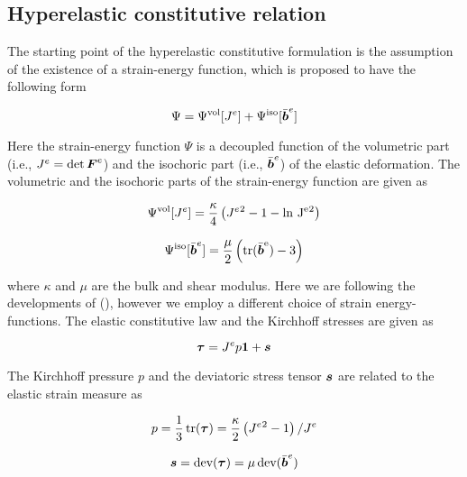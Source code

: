 \documentclass[11pt]{article}
\theoremstyle{remark}
\begin{document}
\subsection{Hyperelastic constitutive relation}
The starting point of the hyperelastic constitutive formulation is 
the assumption of the existence of a strain-energy function, which is
proposed to have the following form

\begin{equation}
\Psi=\Psi^{\rm vol}[J^e] + \Psi^{\rm iso}[\bar{{\boldsymbol{b}}}^e]
\end{equation}

Here the strain-energy function $\Psi$ is a decoupled function of the
volumetric part (i.e., $J^e=\det{\boldsymbol{F}}^e$) and the isochoric part (i.e.,
$\bar{{\boldsymbol{b}}}^e$) of the elastic deformation. The volumetric and the
isochoric parts of the strain-energy function are given as

\begin{equation}
  \Psi^{\rm vol}[J^e] =\frac{\kappa}{4}\left(J^e{^2} - 1 - \rm ln~J^e{^2}\right)
\end{equation}

\begin{equation}
  \Psi^{\rm iso}[\bar{{\boldsymbol{b}}}^e] =
  \frac{\mu}{2}\left(\rm tr(\bar{{\boldsymbol{b}}}^e)-3\right)
\end{equation}

where $\kappa$ and $\mu$ are the bulk and shear modulus. Here we are
following the developments of (\cite{Steinmann1994}), however we
employ a different choice of strain energy-functions. The elastic
constitutive law and the Kirchhoff stresses are given as

\begin{equation}\label{eq:Kirchhoff}
{\boldsymbol{\tau}}=J^e p {\boldsymbol{1}} + {\boldsymbol{s}}
\end{equation}

The Kirchhoff pressure $p$ and the deviatoric stress tensor ${\boldsymbol{s}}$ are
related to the elastic strain measure as

\begin{equation}\label{eq:p}
p = \frac{1}{3}\operatorname{\text{tr}}({\boldsymbol{\tau}}) = \frac{\kappa}{2}\left(J^e{^2}-1\right)/J^e
\end{equation}

\begin{equation}\label{eq:s}
{\boldsymbol{s}} = \operatorname{\text{dev}}({\boldsymbol{\tau}}) = \mu\operatorname{\text{dev}}(\bar{{\boldsymbol{b}}}^e)
\end{equation}

\end{document}
